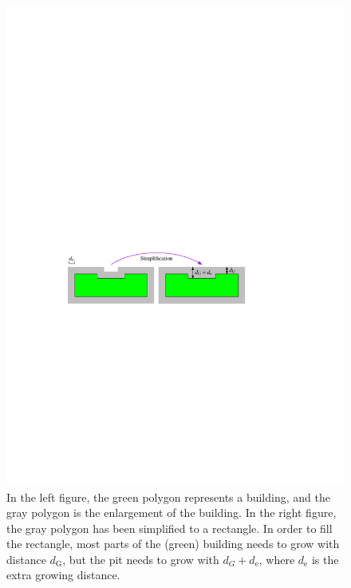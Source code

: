 \documentclass[graybox]{svmult}
\begin{document}
\begin{figure}[tb]
	\centering
	\includegraphics{ExtraGrowth}
	\caption{In the left figure, the green polygon represents a building, and 
	the gray polygon is the enlargement of the building. In the right 
	figure, the gray polygon has been simplified to a rectangle. In order to 
	fill the rectangle, most parts of the (green) building needs to grow with
	distance $d_\mathrm{G}$, but the pit needs to grow with $d_G + 
	d_\mathrm{e}$, 
	where $d_\mathrm{e}$ is the extra growing distance.}
	\label{fig:ExtraGrowth}
\end{figure}
\end{document}
